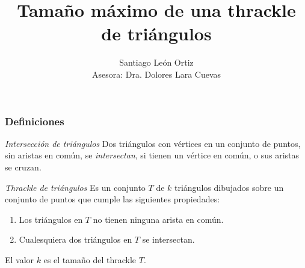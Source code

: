 \documentclass{beamer}
\title{Tamaño máximo de una thrackle de triángulos}
\author [Santiago León O.] {Santiago León Ortiz\\ {\small Asesora: Dra. Dolores Lara Cuevas}}
\institute [Cinvestav, Computación] { }
\begin{document}
\begin{frame}
  \maketitle
\end{frame}

\begin{frame}[allowframebreaks]
  \frametitle{Definiciones}
  \begin{block}{\textit{Intersección de triángulos}}
    Dos triángulos con vértices en un conjunto de puntos, sin aristas en común,
    se \emph{intersectan}, si tienen un vértice en común, o sus aristas se
    cruzan.
  \end{block}
  \begin{figure}[htb]
    \centering
    
  \end{figure}
  \begin{block}{\textit{Thrackle de triángulos}}
    Es un conjunto $T$ de $k$ triángulos dibujados sobre un conjunto de
    puntos que cumple las siguientes propiedades:
    \begin{enumerate}
      \item Los triángulos en $T$ no tienen ninguna arista en común.
      \item Cualesquiera dos triángulos en $T$ se intersectan.
    \end{enumerate}
    El valor $k$ es el tamaño del thrackle $T$.
  \end{block}
  \begin{figure}[htb]
    \centering
    
  \end{figure}
\end{frame}
\end{document}
